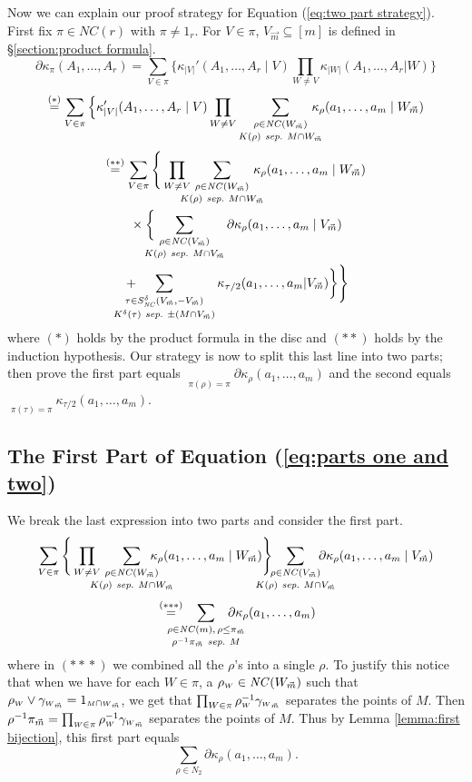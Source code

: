 \documentclass[11pt]{amsart}
\theoremstyle{definition}
\numberwithin{theorem}{section}
\newcommand{\sM}{{\scriptscriptstyle M}}
\newcommand{\sW}{{\scriptscriptstyle W}}
\newcommand{\NC}{\mathit{NC}}
\newcommand{\vm}{{\vec{m}}}
\newcommand{\sep}{\mathit{\ sep.\ }}
\newcommand*{\vv}[1]{\vec{\mkern0mu#1}}
\begin{document}
Now we can explain our proof strategy for Equation
(\ref{eq:two part strategy}). First fix $\pi \in \NC(r)$
with $\pi \not= 1_r$. For $V \in \pi$, $V_\vm \subseteq [m]$
is defined in \S\ref{section:product formula}.
\[
\partial\kappa_\pi(A_1, \dots, A_r) = \sum_{V \in \pi} 
\Big\{
\kappa_{|V|}'(A_1, \dots, A_r \mid V)
\prod_{W \not=V} \kappa_{|W|}(A_1, \dots, A_r | W) \Big\} 
\]
\[
 \stackrel{(*)}{=}
\sum_{V \in \pi} \Big\{
\kappa_{|V|}'(A_1, \dots, A_r \mid V)
\prod_{W \not=V}
\mathop{\sum_{\rho \in \NC(W_{\vv m})}}_{K(\rho) \sep M \cap W_{\vv m}}
\kern-1em
\kappa_\rho(a_1, \dots, a_m \mid W_{\vv m}) 
\]
\begin{multline}\label{eq:parts one and two}
\stackrel{(**)}{=}
\sum_{V \in \pi} \Bigg\{
\prod_{W \not=V} \kern-1em
\mathop{\sum_{\rho \in \NC(W_{\vv m})}}_{K(\rho) \sep M \cap W_{\vv m}}
\kern-1em
\kappa_\rho(a_1, \dots, a_m \mid W_{\vv m}) \\
\mbox{} \times
\bigg\{ \kern-1em
\mathop{\sum_{\rho \in \NC(V_{\vv m})}}_{K(\rho) \sep M \cap V_{\vv m}}
\partial \kappa_\rho(a_1, \dots, a_m \mid V_{\vv m})   \\
\mbox{} + \kern-2em
\mathop{\sum_{\tau \in S_\NC^\delta(V_{\vv m}, -V_{\vv m})}}
_{K^\delta(\tau) \sep \pm (M \cap V_{\vv m})}
\kappa_{\tau/ 2}(a_1, \dots, a_m | V_{\vv m}) \bigg\}\Bigg\}
\end{multline}
where $(*)$ holds by the product formula in the disc and
$(**)$ holds by the induction hypothesis. Our strategy is
now to split this last line into two parts; then prove the
first part equals $\mathop{\sum\limits_{\rho \in
    N_2}}\limits_{\pi(\rho) = \pi} \partial \kappa_\rho(a_1,
\dots, a_m)$ and the second equals
$\mathop{\sum\limits_{\tau \in S_2}}\limits _{\pi(\tau) =
  \pi} \kappa_{\tau/2}(a_1, \dots, a_m)$.

\subsection{\normalsize The First Part of Equation (\ref{eq:parts one and two})}

We break the last expression into two parts and consider the first part. 
\[
\sum_{V \in \pi}\Bigg\{
\prod_{W \not=V} \kern-1.0em
\mathop{\sum_{\rho \in \NC(W_{\vv m})}}_{K(\rho) \sep M \cap W_{\vv m}}
\kern-2em
\kappa_\rho(a_1, \dots, a_m \mid W_{\vv m})
\Bigg\}  \kern-1.5em
\mathop{\sum_{\rho \in \NC(V_{\vv m})}}_{K(\rho) \sep M \cap V_{\vv m}} \kern-1.5em
\partial \kappa_\rho(a_1, \dots, a_m \mid V_{\vv m})
\]
\[
\mbox{} \stackrel{(***)}{=} \kern-1.5em
\mathop{\sum_{\rho \in \NC(m),\, \rho \leq \pi_\vm}}_{\rho^{-1}\pi_\vm \sep M} \kern-1.5em
\partial \kappa_\rho(a_1, \dots, a_m)
\]
where in $(*\!*\!*)$ we combined all the $\rho$'s into a
single $\rho$. To justify this notice that when we have for
each $W \in \pi$, a $\rho_\sW \in \NC(W_{\vv m})$ such that
$\rho_\sW \vee \gamma_{\sW_{\vv m}} = 1_{\sM \cap \sW_{\vv
    m}}$, we get that $\prod_{W \in \pi} \rho_\sW^{-1}
\gamma_{\sW_{\vv m}}$ separates the points of $M$. Then
$\rho^{-1} \pi_{\vv m} = \prod_{\sW \in \pi} \rho_\sW^{-1}
\gamma_{\sW_{\vv m}}$ separates the points of $M$.  Thus by
Lemma \ref{lemma:first bijection}, this first part equals
\[
\sum_{\rho \in N_2} \partial \kappa_\rho(a_1, \dots, a_m).
\]
\end{document}
